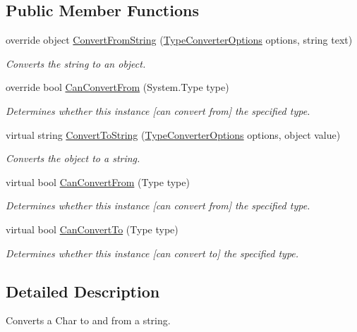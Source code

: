 \subsection*{Public Member Functions}
\begin{DoxyCompactItemize}
\item 
override object \hyperlink{a00050_a7cf201b75714eccdc084b6cc3161bf29}{Convert\-From\-String} (\hyperlink{a00180}{Type\-Converter\-Options} options, string text)
\begin{DoxyCompactList}\small\item\em Converts the string to an object. \end{DoxyCompactList}\item 
override bool \hyperlink{a00050_ab0ccecf34e8ba3710cc61ad643028a34}{Can\-Convert\-From} (System.\-Type type)
\begin{DoxyCompactList}\small\item\em Determines whether this instance \mbox{[}can convert from\mbox{]} the specified type. \end{DoxyCompactList}\item 
virtual string \hyperlink{a00090_a36cb2f9b24f15a671293f3a722324c27}{Convert\-To\-String} (\hyperlink{a00180}{Type\-Converter\-Options} options, object value)
\begin{DoxyCompactList}\small\item\em Converts the object to a string. \end{DoxyCompactList}\item 
virtual bool \hyperlink{a00090_a470d21adaa704eb281250dbd112ff91a}{Can\-Convert\-From} (Type type)
\begin{DoxyCompactList}\small\item\em Determines whether this instance \mbox{[}can convert from\mbox{]} the specified type. \end{DoxyCompactList}\item 
virtual bool \hyperlink{a00090_acb65bd8c8199d88d5b1629ae35d18514}{Can\-Convert\-To} (Type type)
\begin{DoxyCompactList}\small\item\em Determines whether this instance \mbox{[}can convert to\mbox{]} the specified type. \end{DoxyCompactList}\end{DoxyCompactItemize}


\subsection{Detailed Description}
Converts a Char to and from a string. 



